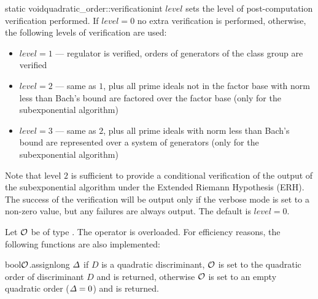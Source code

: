 \begin{fcode}{static void}{quadratic_order::verification}{int $\mathit{level}$}
  sets the level of post-computation verification performed.  If $\mathit{level} = 0$ no extra
  verification is performed, otherwise, the following levels of verification are used:
  \begin{itemize}
  \item $\mathit{level} = 1$ --- regulator is verified, orders of generators of the class group
    are verified
  \item $\mathit{level} = 2$ --- same as $1$, plus all prime ideals not in the factor base with
    norm less than Bach's bound are factored over the factor base (only for the subexponential
    algorithm)
  \item $\mathit{level} = 3$ --- same as $2$, plus all prime ideals with norm less than Bach's
    bound are represented over a system of generators (only for the subexponential algorithm)
  \end{itemize}
  Note that level $2$ is sufficient to provide a conditional verification of the output of the
  subexponential algorithm under the Extended Riemann Hypothesis (ERH).
  The success of the verification will be output only if the verbose mode is set to a non-zero
  value, but any failures are always output.  The default is $\mathit{level} = 0$.
\end{fcode}



\ASGN

Let $\mathcal{O}$ be of type .  The operator \code{=} is overloaded.  For
efficiency reasons, the following functions are also implemented:

\begin{fcode}{bool}{$\mathcal{O}$.assign}{long $\varDelta$}
  if $D$ is a quadratic discriminant, $\mathcal{O}$ is set to the quadratic order of discriminant $D$
  and \TRUE is returned, otherwise $\mathcal{O}$ is set to an empty quadratic order ($\varDelta = 0$) and
  \FALSE is returned.
\end{fcode}

